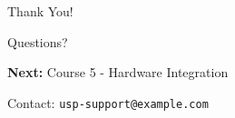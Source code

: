 \documentclass{beamer}
\begin{document}
\begin{frame}[plain]
\begin{center}
\Huge Thank You!

\vspace{1cm}

\Large Questions?

\vspace{1cm}

\normalsize
\textbf{Next:} Course 5 - Hardware Integration

\vspace{0.5cm}

Contact: \texttt{usp-support@example.com}
\end{center}
\end{frame}
\end{document}
